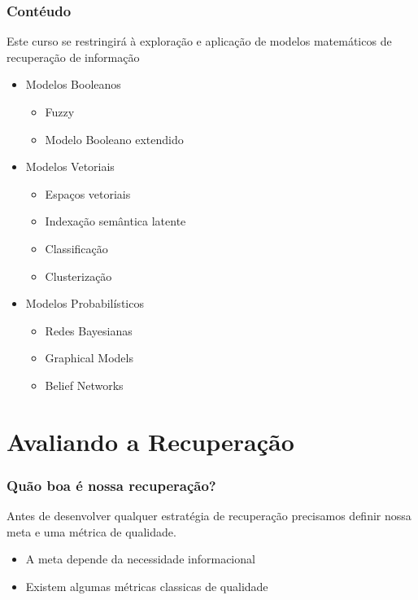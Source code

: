\documentclass[compress]{beamer}
\begin{document}
\begin{frame}[fragile]
\frametitle{Contéudo}
Este curso se restringirá à exploração e aplicação de modelos matemáticos de recuperação de informação
\begin{itemize}[<+->]
 \item Modelos Booleanos
  \begin{itemize}
    \item Fuzzy
    \item Modelo Booleano extendido
  \end{itemize}
 \item Modelos Vetoriais
  \begin{itemize}
    \item Espaços vetoriais
    \item Indexação semântica latente
    \item Classificação
    \item Clusterização
  \end{itemize}
 \item Modelos Probabilísticos
  \begin{itemize}
    \item Redes Bayesianas
    \item Graphical Models
    \item Belief Networks
  \end{itemize}
\end{itemize}
\end{frame}

\section{Avaliando a Recuperação}
\begin{frame}[fragile]
\frametitle{Quão boa é nossa recuperação?}
Antes de desenvolver qualquer estratégia de recuperação precisamos definir nossa meta e uma métrica de qualidade.
\begin{itemize}[<+->]
 \item A meta depende da necessidade informacional
 \item Existem algumas métricas classicas de qualidade
\end{itemize}
\end{frame}
\end{document}

